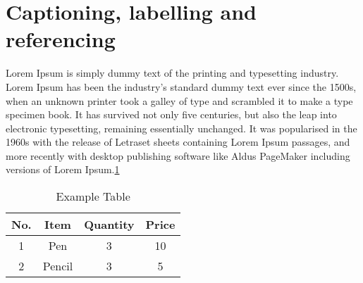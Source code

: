 \documentclass{article}
\begin{document}
	
	
	\section{Captioning, labelling and referencing} 
	Lorem Ipsum is simply dummy text of the printing and typesetting industry. 
	Lorem Ipsum has been the industry's standard dummy text ever since the 
	1500s, 
	when an unknown printer took a galley of type and scrambled it to make a 
	type 
	specimen book. It has survived not only five centuries, but also the leap 
	into 
	electronic typesetting, remaining essentially unchanged. It was popularised 
	in 
	the 1960s with the release of Letraset sheets containing Lorem Ipsum 
	passages, 
	and more recently with desktop publishing software like Aldus PageMaker 
	including versions of Lorem Ipsum.\ref{tab:1}
	
	\begin{table}[h]
		\centering
		\begin{tabular}{|c|c|c|c|}
			\hline
			No. & Item & Quantity & Price \\
			\hline
			1 & Pen & 3 & 10 \\
			\hline 
			\cline{1-2} \cline{4-4}
			2 & Pencil & 3  & 5 \\
			\hline
		\end{tabular}
		\caption{Example Table}
		\label{tab:1}
	\end{table}
\end{document}
